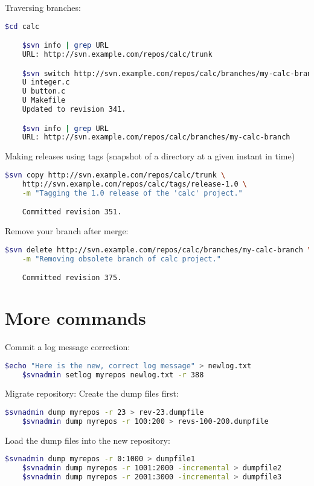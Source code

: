 \documentclass{article}
\begin{document}
Traversing branches:
\begin{lstlisting}[language=BASH]
    $cd calc

    $svn info | grep URL
    URL: http://svn.example.com/repos/calc/trunk

    $svn switch http://svn.example.com/repos/calc/branches/my-calc-branch
    U integer.c
    U button.c
    U Makefile
    Updated to revision 341.

    $svn info | grep URL
    URL: http://svn.example.com/repos/calc/branches/my-calc-branch
\end{lstlisting}
Making releases using tags (snapshot of a directory at a given instant in time)
\begin{lstlisting}[language=BASH]
    $svn copy http://svn.example.com/repos/calc/trunk \
    http://svn.example.com/repos/calc/tags/release-1.0 \
    -m "Tagging the 1.0 release of the 'calc' project."

    Committed revision 351.
\end{lstlisting}
    Remove your branch after merge:
\begin{lstlisting}[language=BASH]
    $svn delete http://svn.example.com/repos/calc/branches/my-calc-branch \
    -m "Removing obsolete branch of calc project."

    Committed revision 375.
\end{lstlisting}

\section{More commands}
Commit a log message correction:
\begin{lstlisting}[language=BASH]
    $echo "Here is the new, correct log message" > newlog.txt
    $svnadmin setlog myrepos newlog.txt -r 388
\end{lstlisting}
 Migrate repository:
 Create the dump files first:
\begin{lstlisting}[language=BASH]
    $svnadmin dump myrepos -r 23 > rev-23.dumpfile
    $svnadmin dump myrepos -r 100:200 > revs-100-200.dumpfile
\end{lstlisting}
 Load the dump files into the new repository:
\begin{lstlisting}[language=BASH]    
    $svnadmin dump myrepos -r 0:1000 > dumpfile1
    $svnadmin dump myrepos -r 1001:2000 -incremental > dumpfile2
    $svnadmin dump myrepos -r 2001:3000 -incremental > dumpfile3 
\end{lstlisting}
\end{document}
